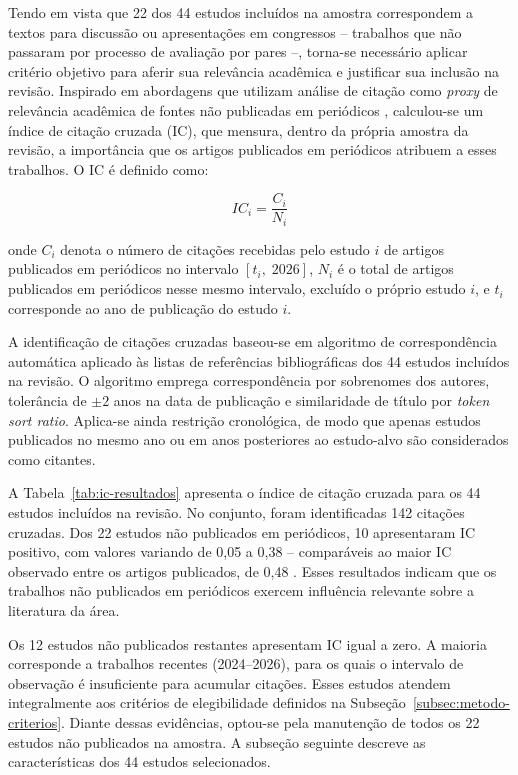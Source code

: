 Tendo em vista que 22 dos 44 estudos incluídos na amostra correspondem a textos para discussão ou apresentações em congressos -- trabalhos que não passaram por processo de avaliação por pares --, torna-se necessário aplicar critério objetivo para aferir sua relevância acadêmica e justificar sua inclusão na revisão. Inspirado em abordagens que utilizam análise de citação como \textit{proxy} de relevância acadêmica de fontes não publicadas em periódicos \cite{Sibbald2015, Kousha2022}, calculou-se um índice de citação cruzada (IC), que mensura, dentro da própria amostra da revisão, a importância que os artigos publicados em periódicos atribuem a esses trabalhos. O IC é definido como:

\begin{equation}
\label{eq:ic}
IC_i = \frac{C_i}{N_i}
\end{equation}

\noindent onde $C_i$ denota o número de citações recebidas pelo estudo $i$ de artigos publicados em periódicos no intervalo $[t_i,\; 2026]$, $N_i$ é o total de artigos publicados em periódicos nesse mesmo intervalo, excluído o próprio estudo $i$, e $t_i$ corresponde ao ano de publicação do estudo $i$.



A identificação de citações cruzadas baseou-se em algoritmo de correspondência automática aplicado às listas de referências bibliográficas dos 44 estudos incluídos na revisão. O algoritmo emprega correspondência por sobrenomes dos autores, tolerância de $\pm 2$ anos na data de publicação e similaridade de título por \textit{token sort ratio}. Aplica-se ainda restrição cronológica, de modo que apenas estudos publicados no mesmo ano ou em anos posteriores ao estudo-alvo são considerados como citantes.

A Tabela~\ref{tab:ic-resultados} apresenta o índice de citação cruzada para os 44 estudos incluídos na revisão. No conjunto, foram identificadas 142 citações cruzadas. Dos 22 estudos não publicados em periódicos, 10 apresentaram IC positivo, com valores variando de 0,05 a 0,38 -- comparáveis ao maior IC observado entre os artigos publicados, de 0,48 \cite{SilvaResende2009}. Esses resultados indicam que os trabalhos não publicados em periódicos exercem influência relevante sobre a literatura da área.

Os 12 estudos não publicados restantes apresentam IC igual a zero. A maioria corresponde a trabalhos recentes (2024--2026), para os quais o intervalo de observação é insuficiente para acumular citações. Esses estudos atendem integralmente aos critérios de elegibilidade definidos na Subseção~\ref{subsec:metodo-criterios}. Diante dessas evidências, optou-se pela manutenção de todos os 22 estudos não publicados na amostra. A subseção seguinte descreve as características dos 44 estudos selecionados.


